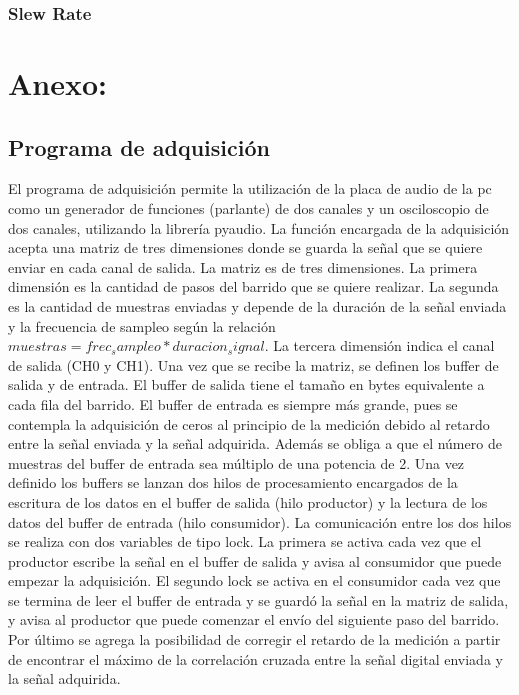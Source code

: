 \documentclass[a4paper, 11pt]{article}
\begin{document}
\subsubsection*{Slew Rate}

\section*{Anexo:}
\subsection*{Programa de adquisición}
El programa de adquisición permite la utilización de la placa de audio de la pc como un generador de funciones (parlante) de dos canales y un osciloscopio de dos canales, utilizando la librería pyaudio. La función encargada de la adquisición acepta una matriz de tres dimensiones donde se guarda la señal que se quiere enviar en cada canal de salida. La matriz es de tres dimensiones. La primera dimensión es la cantidad de pasos del barrido que se quiere realizar. La segunda es la cantidad de muestras enviadas y depende de la duración de la señal enviada y la frecuencia de sampleo según la relación $muestras=frec_sampleo*duracion_signal$. La tercera dimensión indica el canal de salida (CH0 y CH1).
Una vez que se recibe la matriz, se definen los buffer de salida y de entrada. El buffer de salida tiene el tamaño en bytes equivalente a cada fila del barrido. El buffer de entrada es siempre más grande, pues se contempla la adquisición de ceros al principio de la medición debido al retardo entre la señal enviada y la señal adquirida. Además se obliga a que el número de muestras del buffer de entrada sea múltiplo de una potencia de 2.
Una vez definido los buffers se lanzan dos hilos de procesamiento encargados de la escritura de los datos en el buffer de salida (hilo productor) y la lectura de los datos del buffer de entrada (hilo consumidor). La comunicación entre los dos hilos se realiza con dos variables de tipo lock. La primera se activa cada vez que el productor escribe la señal en el buffer de salida y avisa al consumidor que puede empezar la adquisición. El segundo lock se activa en el consumidor cada vez que se termina de leer el buffer de entrada y se guardó la señal en la matriz de salida, y avisa al productor que puede comenzar el envío del siguiente paso del barrido.
Por último se agrega la posibilidad de corregir el retardo de la medición a partir de encontrar el máximo de la correlación cruzada entre la señal digital enviada y la señal adquirida.
\end{document}
